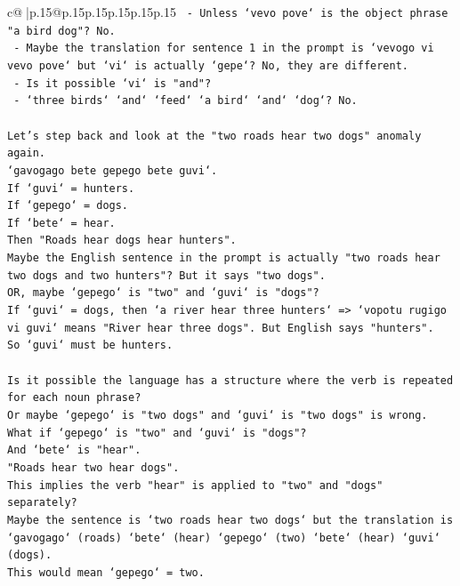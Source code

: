\documentclass{article}
\begin{document}
{\begin{supertabular}{c@{$\;$}|p{.15\linewidth}@{}p{.15\linewidth}p{.15\linewidth}p{.15\linewidth}p{.15\linewidth}p{.15\linewidth}}
{{{\texttt{                   {-} Unless `vevo pove` is the object phrase "a bird dog"? No.} \\
\texttt{                   {-} Maybe the translation for sentence 1 in the prompt is `vevogo vi vevo pove` but `vi` is actually `gepe`? No, they are different.} \\
\texttt{                   {-} Is it possible `vi` is "and"?} \\
\texttt{                   {-} `three birds` `and` `feed` `a bird` `and` `dog`? No.} \\
\\ 
\texttt{Let's step back and look at the "two roads hear two dogs" anomaly again.} \\
\texttt{`gavogago bete gepego bete guvi`.} \\
\texttt{If `guvi` = hunters.} \\
\texttt{If `gepego` = dogs.} \\
\texttt{If `bete` = hear.} \\
\texttt{Then "Roads hear dogs hear hunters".} \\
\texttt{Maybe the English sentence in the prompt is actually "two roads hear two dogs and two hunters"? But it says "two dogs".} \\
\texttt{OR, maybe `gepego` is "two" and `guvi` is "dogs"?} \\
\texttt{If `guvi` = dogs, then `a river hear three hunters` => `vopotu rugigo vi guvi` means "River hear three dogs". But English says "hunters".} \\
\texttt{So `guvi` must be hunters.} \\
\\ 
\texttt{Is it possible the language has a structure where the verb is repeated for each noun phrase?} \\
\texttt{Or maybe `gepego` is "two dogs" and `guvi` is "two dogs" is wrong.} \\
\texttt{What if `gepego` is "two" and `guvi` is "dogs"?} \\
\texttt{And `bete` is "hear".} \\
\texttt{"Roads hear two hear dogs".} \\
\texttt{This implies the verb "hear" is applied to "two" and "dogs" separately?} \\
\texttt{Maybe the sentence is `two roads hear two dogs` but the translation is `gavogago` (roads) `bete` (hear) `gepego` (two) `bete` (hear) `guvi` (dogs).} \\
\texttt{This would mean `gepego` = two.} \\
}}}
\end{supertabular}}
\end{document}

